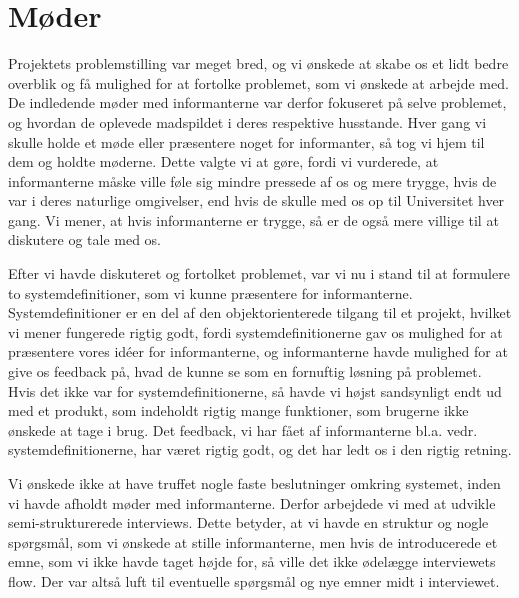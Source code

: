 \section{Møder}
Projektets problemstilling var meget bred, og vi ønskede at skabe os et lidt bedre overblik og få mulighed for at fortolke problemet, som vi ønskede at arbejde med. De indledende møder med informanterne var derfor fokuseret på selve problemet, og hvordan de oplevede madspildet i deres respektive husstande. Hver gang vi skulle holde et møde eller præsentere noget for informanter, så tog vi hjem til dem og holdte møderne. Dette valgte vi at gøre, fordi vi vurderede, at informanterne måske ville føle sig mindre pressede af os og mere trygge, hvis de var i deres naturlige omgivelser, end hvis de skulle med os op til Universitet hver gang. Vi mener, at hvis informanterne er trygge, så er de også mere villige til at diskutere og tale med os.

Efter vi havde diskuteret og fortolket problemet, var vi nu i stand til at formulere to systemdefinitioner, som vi kunne præsentere for informanterne. Systemdefinitioner er en del af den objektorienterede tilgang til et projekt, hvilket vi mener fungerede rigtig godt, fordi systemdefinitionerne gav os mulighed for at præsentere vores idéer for informanterne, og informanterne havde mulighed for at give os feedback på, hvad de kunne se som en fornuftig løsning på problemet. Hvis det ikke var for systemdefinitionerne, så havde vi højst sandsynligt endt ud med et produkt, som indeholdt rigtig mange funktioner, som brugerne ikke ønskede at tage i brug. Det feedback, vi har fået af informanterne bl.a. vedr. systemdefinitionerne, har været rigtig godt, og det har ledt os i den rigtig retning. 

Vi ønskede ikke at have truffet nogle faste beslutninger omkring systemet, inden vi havde afholdt møder med informanterne. Derfor arbejdede vi med at udvikle semi-strukturerede interviews. Dette betyder, at vi havde en struktur og nogle spørgsmål, som vi ønskede at stille informanterne, men hvis de introducerede et emne, som vi ikke havde taget højde for, så ville det ikke ødelægge interviewets flow. Der var altså luft til eventuelle spørgsmål og nye emner midt i interviewet.

